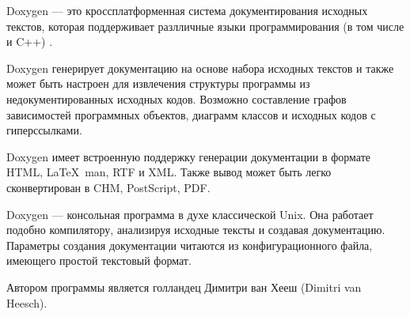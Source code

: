 Doxygen --- это кроссплатформенная система документирования исходных текстов, которая поддерживает разлличные языки программирования (в том числе и C++) \cite{doxygen}. 

Doxygen генерирует документацию на основе набора исходных текстов и также может быть настроен для извлечения структуры программы из недокументированных исходных кодов. Возможно составление графов зависимостей программных объектов, диаграмм классов и исходных кодов с гиперссылками.

Doxygen имеет встроенную поддержку генерации документации в формате HTML, \LaTeX\, man, RTF и XML. Также вывод может быть легко сконвертирован в CHM, PostScript, PDF.

Doxygen — консольная программа в духе классической Unix. Она работает подобно компилятору, анализируя исходные тексты и создавая документацию. Параметры создания документации читаются из конфигурационного файла, имеющего простой текстовый формат.

Автором программы является голландец Димитри ван Хееш (Dimitri van Heesch).
